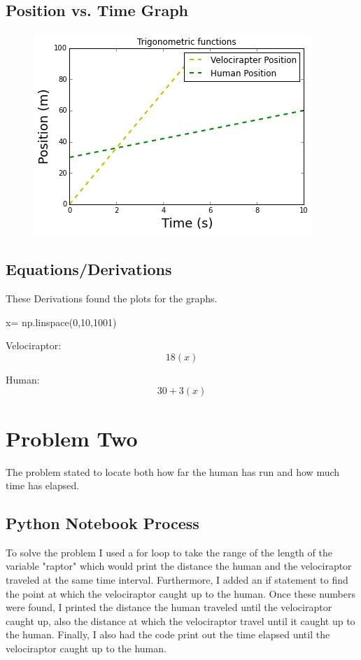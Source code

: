 \documentclass[twocolumn]{revtex4}
\begin{document}
\subsection{Position vs. Time Graph}
\begin{figure}[ht]
\begin{center}
\includegraphics[scale=0.5]{Problem1_GraphImage.png}
\end{center}
\end{figure}
\subsection{Equations/Derivations}
These Derivations found the plots for the graphs.

x= np.linspace(0,10,1001)

Velociraptor:$$18(x)$$

Human:$$30+3(x)$$


\section{Problem Two}
The problem stated to locate both how far the human has run and how much time has elapsed.
\subsection{Python Notebook Process}
To solve the problem I used a for loop to take the range of the length of the variable "raptor" which would print the distance the human and the velociraptor traveled at the same time interval. Furthermore, I added an if statement to find the point at which the velociraptor caught up to the human. Once these numbers were found, I printed the distance the human traveled until the velociraptor caught up, also the distance at which the velociraptor travel until it caught up to the human. Finally, I also had the code print out the time elapsed until the velociraptor caught up to the human.
\end{document}
